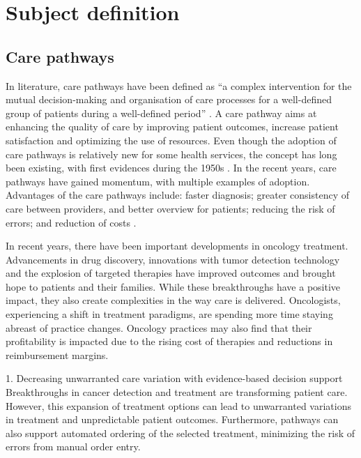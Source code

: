 \section{Subject definition}

\subsection{Care pathways}

In literature, care pathways have been defined as ``a complex intervention for
the mutual decision-making and organisation of care processes for a well-defined
group of patients during a well-defined period'' \cite{vanhaecht_impact_2007}. A
care pathway aims at enhancing the quality of care by improving patient
outcomes, increase patient satisfaction and optimizing the use of resources.
Even though the adoption of care pathways is relatively new for some health
services, the concept has long been existing, with first evidences during the
1950s \cite{schrijvers_care_2012}. In the recent years, care pathways have
gained momentum, with multiple examples of adoption. Advantages of the care
pathways include: faster diagnosis; greater consistency of care between
providers, and better overview for patients; reducing the risk of errors;
and reduction of costs \cite{schrijvers_care_2012}.

In recent years, there have been important developments in oncology treatment.
Advancements in drug discovery, innovations with tumor detection technology and
the explosion of targeted therapies have improved outcomes and brought hope to
patients and their families. While these breakthroughs have a positive impact,
they also create complexities in the way care is delivered. Oncologists,
experiencing a shift in treatment paradigms, are spending more time staying
abreast of practice changes. Oncology practices may also find that their
profitability is impacted due to the rising cost of therapies and reductions in
reimbursement margins.

1. Decreasing unwarranted care variation with evidence-based
decision support
Breakthroughs in cancer detection and treatment are
transforming patient care. However, this expansion of treatment options can lead
to unwarranted variations in treatment and unpredictable patient outcomes.
Furthermore, pathways can also support automated ordering of the selected treatment, minimizing the risk of errors from manual order entry.

